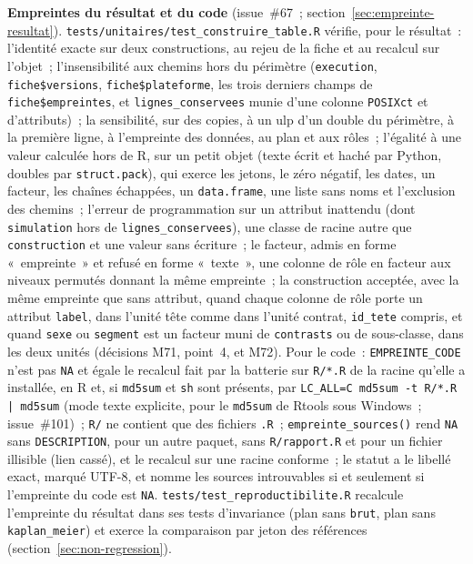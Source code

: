 \documentclass[a4paper,11pt]{article}
\newcommand{\code}[1]{\texttt{\small #1}}
\begin{document}
\medskip
{\sloppy \textbf{Empreintes du résultat et du code} (issue~\#67~;
section~\ref{sec:empreinte-resultat}).
\code{tests/unitaires/test\_construire\_table.R} vérifie, pour le résultat~:
l'identité exacte sur deux constructions, au rejeu de la fiche et au
recalcul sur l'objet~; l'insensibilité aux chemins hors du périmètre
(\code{execution}, \code{fiche\$versions}, \code{fiche\$plateforme}, les
trois derniers champs de \code{fiche\$empreintes}, et
\code{lignes\_conservees} munie d'une colonne \code{POSIXct} et
d'attributs)~; la sensibilité, sur des copies, à un ulp d'un double du
périmètre, à la première ligne, à l'empreinte des données, au plan et aux
rôles~; l'égalité à une valeur calculée hors de R, sur un petit objet
(texte écrit et haché par Python, doubles par \code{struct.pack}), qui
exerce les jetons, le zéro négatif, les dates, un facteur, les chaînes
échappées, un \code{data.frame}, une liste sans noms et l'exclusion des
chemins~; l'erreur de programmation sur un attribut inattendu (dont
\code{simulation} hors de \code{lignes\_conservees}), une classe de racine
autre que \code{construction} et une valeur sans écriture~; le facteur,
admis en forme «~empreinte~» et refusé en forme «~texte~», une colonne de
rôle en facteur aux niveaux permutés donnant la même empreinte~; la
construction acceptée, avec la même empreinte que sans attribut, quand
chaque colonne de rôle porte un attribut \code{label}, dans l'unité tête
comme dans l'unité contrat, \code{id\_tete} compris, et quand \code{sexe} ou
\code{segment} est un facteur muni de \code{contrasts} ou de sous-classe,
dans les deux unités (décisions M71, point~4, et M72). Pour le code~:
\code{EMPREINTE\_CODE} n'est pas \code{NA} et égale le recalcul fait par la
batterie sur \code{R/*.R} de la racine qu'elle a installée, en R et, si
\code{md5sum} et \code{sh} sont présents, par
\code{LC\_ALL=C md5sum -t R/*.R | md5sum} (mode texte explicite, pour le
\code{md5sum} de Rtools sous Windows~; issue~\#101)~; \code{R/} ne contient que des
fichiers \code{*.R}~; \code{empreinte\_sources()} rend \code{NA} sans
\code{DESCRIPTION}, pour un autre paquet, sans \code{R/rapport.R} et pour
un fichier illisible (lien cassé), et le recalcul sur une racine conforme~;
le statut a le libellé exact, marqué UTF-8, et nomme les sources
introuvables si et seulement si l'empreinte du code est \code{NA}.
\code{tests/test\_reproductibilite.R} recalcule l'empreinte du résultat dans
ses tests d'invariance (plan sans \code{brut}, plan sans
\code{kaplan\_meier}) et exerce la comparaison par jeton des références
(section~\ref{sec:non-regression}).\par}
\end{document}
